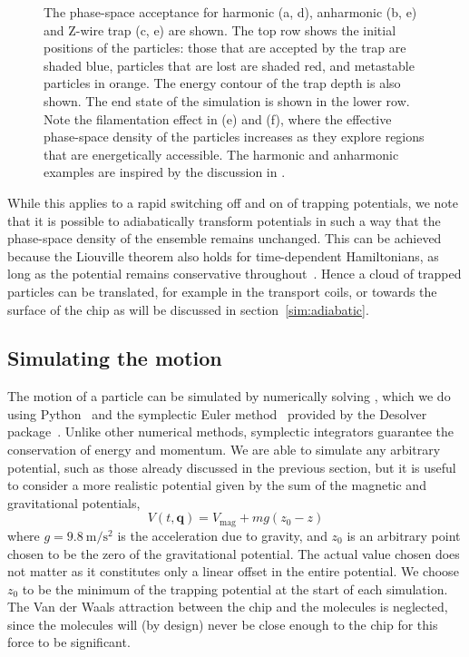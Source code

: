 \begin{figure}[htb]
  \centering
  \caption{
    The phase-space acceptance for harmonic (a, d), anharmonic (b, e) and
    Z-wire trap (c, e) are shown. The top row shows the initial positions of
    the particles: those that are accepted by the trap are shaded blue,
    particles that are lost are shaded red, and metastable particles in orange.
    The energy contour of the trap depth is also shown. The end state of the
    simulation is shown in the lower row. Note the filamentation effect in (e)
    and (f), where the effective phase-space density of the particles increases
    as they explore regions that are energetically accessible. The harmonic and
    anharmonic examples are inspired by the discussion in
    .
  }
  \label{sim:fig:psaeg}
\end{figure}

While this applies to a rapid switching off and on of trapping potentials, we
note that it is possible to adiabatically transform potentials in such a way
that the phase-space density of the ensemble remains unchanged. This can be
achieved because the Liouville theorem also holds for time-dependent
Hamiltonians, as long as the potential remains conservative
throughout~\cite{Hand1998, Lichtenberg1969}. Hence a cloud of trapped particles
can be translated, for example in the transport coils, or towards the surface
of the chip as will be discussed in section~\ref{sim:adiabatic}.

\subsection{Simulating the motion}
\label{sim:motion:simmethods}

The motion of a particle can be simulated by numerically solving
, which we do using Python~\cite{python} and the
symplectic Euler method~\cite{Hairer2015, doi:10.1119/1.2034523} provided by
the Desolver package~\cite{desolver}. Unlike other numerical methods,
symplectic integrators guarantee the conservation of energy and momentum.
We are able to simulate any arbitrary potential, such as those already
discussed in the previous section, but it is useful to consider a more
realistic potential given by the sum of the magnetic and gravitational
potentials,
%
\begin{equation}
  V(t, \mathbf{q}) = V_\text{mag} + mg(z_0-z)
\end{equation}
where $g=\SI{9.8}{\meter\per\second\squared}$ is the acceleration due to
gravity, and $z_0$ is an arbitrary point chosen to be the zero of the
gravitational potential. The actual value chosen does not matter as it
constitutes only a linear offset in the entire potential. We choose
$z_0$ to be the minimum of the trapping potential at the start of each
simulation.
%
The Van der Waals attraction between the chip and the molecules is neglected,
since the molecules will (by design) never be close enough to the chip for this
force to be significant.

